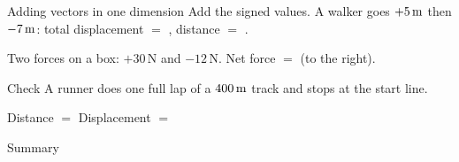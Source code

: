\begin{nrow}{Adding vectors in one dimension}
Add the signed values. A walker goes $+5\,\mathrm{m}$ then $-7\,\mathrm{m}$: total displacement $=$ \fillin{$-2\m$}, distance $=$ \fillin{$12\m$}.\par
\smallskip Two forces on a box: $+30\,\mathrm{N}$ and $-12\,\mathrm{N}$. Net force $=$  (to the right).
\end{nrow}
\begin{nrow}{Check}
A runner does one full lap of a $400\m$ track and stops at the start line.\par
Distance $=$ \fillin{$400\m$} \qquad Displacement $=$ \fillin{$0\m$}
\end{nrow}
\begin{nrow}{Summary}
\else\vspace{2.4cm}\fi
\end{nrow}

